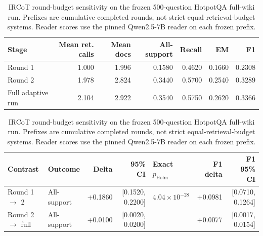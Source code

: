 \begin{table}[t]
\centering
\caption{IRCoT round-budget sensitivity on the frozen 500-question HotpotQA full-wiki run. Prefixes are cumulative completed rounds, not strict equal-retrieval-budget systems. Reader scores use the pinned Qwen2.5-7B reader on each frozen prefix.}
\label{tab:ircot_round_budget}
\scriptsize
\setlength{\tabcolsep}{3.0pt}
\begin{tabular}{lrrrrrr}
\toprule
Stage & Mean ret. calls & Mean docs & All-support & Recall & EM & F1 \\
\midrule
Round 1 & 1.000 & 1.996 & 0.1580 & 0.4620 & 0.1660 & 0.2308 \\
Round 2 & 1.978 & 2.824 & 0.3440 & 0.5700 & 0.2540 & 0.3289 \\
Full adaptive run & 2.104 & 2.922 & 0.3540 & 0.5750 & 0.2620 & 0.3366 \\
\bottomrule
\end{tabular}
\par\smallskip
\begin{tabularx}{\textwidth}{llrr>{\raggedright\arraybackslash}Xrr}
\toprule
Contrast & Outcome & Delta & 95\% CI & Exact $p_{\mathrm{Holm}}$ & F1 delta & F1 95\% CI \\
\midrule
Round 1 $\rightarrow$ 2 & All-support & +0.1860 & [0.1520, 0.2200] & $4.04\!\times\!10^{-28}$ & +0.0981 & [0.0710, 0.1264] \\
Round 2 $\rightarrow$ full & All-support & +0.0100 & [0.0020, 0.0200] & 0.0625 & +0.0077 & [0.0017, 0.0154] \\
\bottomrule
\end{tabularx}
\end{table}
